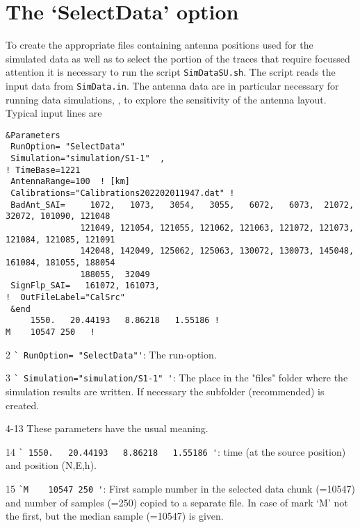 \clearpage
\section{The `SelectData' option}

To create the appropriate files containing antenna positions used for the simulated data as well as to select the portion of the traces that require focussed attention it is necessary to run the script \verb!SimDataSU.sh!. The script reads the input data from \verb!SimData.in!.
The antenna data are in particular necessary for running data simulations, , to explore the sensitivity of the antenna layout.
Typical input lines are

\begin{linenumbers}
\resetlinenumber
\begin{verbatim}
&Parameters
 RunOption= "SelectData"
 Simulation="simulation/S1-1"  ,
! TimeBase=1221
 AntennaRange=100  ! [km]
 Calibrations="Calibrations202202011947.dat" ! 
 BadAnt_SAI=     1072,   1073,   3054,   3055,   6072,   6073,  21072,  32072, 101090, 121048
               121049, 121054, 121055, 121062, 121063, 121072, 121073, 121084, 121085, 121091
               142048, 142049, 125062, 125063, 130072, 130073, 145048, 161084, 181055, 188054
               188055,  32049   
 SignFlp_SAI=   161072, 161073,
!  OutFileLabel="CalSrc"
 &end
     1550.   20.44193   8.86218   1.55186 !
M    10547 250   !
\end{verbatim}
\end{linenumbers}


\begin{enumerate*}
\item[2] \verb#` RunOption= "SelectData"'#: The run-option.
\item[3] \verb#` Simulation="simulation/S1-1" '#:  The place in the "files" folder where the simulation results are written. If necessary the subfolder (recommended) is created.
\item[4-13] These parameters have the usual meaning.
\item[14] \verb#` 1550.   20.44193   8.86218   1.55186 '#:  time (at the source position) and position (N,E,h). 
\item[15] \verb#`M    10547 250 '#: First sample number in the selected data chunk (=10547) and number of samples (=250) copied to a separate file. In case of mark `M' not the first, but the median sample (=10547) is given. 
\end{enumerate*}


